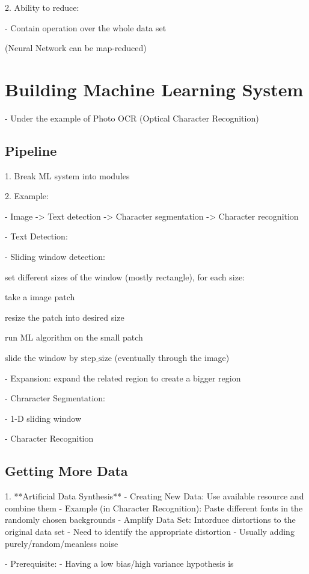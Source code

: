 2. Ability to reduce:

- Contain operation over the whole data set

(Neural Network can be map-reduced)

\section{Building Machine Learning System}

- Under the example of Photo OCR (Optical Character Recognition)

\subsection{Pipeline}

1. Break ML system into modules

2. Example:

- Image -> Text detection -> Character segmentation -> Character recognition

- Text Detection: 

- Sliding window detection: 

	set different sizes of the window (mostly rectangle), for each size:

		take a image patch

		resize the patch into desired size

		run ML algorithm on the small patch

		slide the window by $\text{step\_size}$  (eventually through the image)

- Expansion: expand the related region to create a bigger region

- Chraracter Segmentation:

- 1-D sliding window

- Character Recognition

\subsection{Getting More Data}

1. **Artificial Data Synthesis** 
- Creating New Data: Use available resource and combine them
- Example (in Character Recognition): Paste different fonts in the randomly chosen backgrounds
- Amplify Data Set: Intorduce distortions to the original data set
- Need to identify the appropriate distortion
- Usually adding purely/random/meanless noise

- Prerequisite:
- Having a low bias/high variance hypothesis is 

